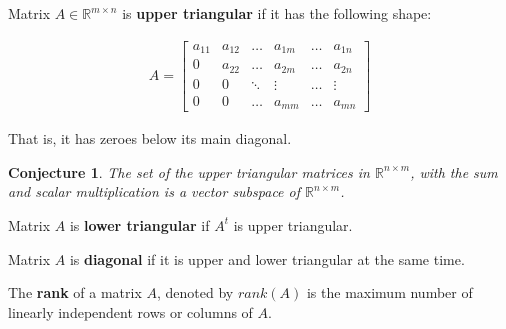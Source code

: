 \documentclass[aspectratio=169]{beamer}
\newtheorem{proposition}{Conjecture}[section]
\begin{document}
\begin{frame}
    \begin{definition}
        Matrix $A\in\mathbb{R}^{m\times n}$ is \textbf{upper triangular} if it has the following shape:
        
        \begin{align*}
            A=\left[
            \begin{array}{cccccc}
                a_{11} & a_{12} & \ldots & a_{1m} & \ldots & a_{1n}\\
                0 & a_{22} & \ldots & a_{2m} & \ldots & a_{2n}\\
                0 & 0 & \ddots & \vdots & \ldots& \vdots\\
                0 & 0 & \ldots & a_{mm} & \ldots & a_{mn}
            \end{array}
            \right]
        \end{align*}
        
        That is, it has zeroes below its main diagonal.
    \end{definition}
    
    \begin{proposition}
        The set of the upper triangular matrices in $\mathbb{R}^{n\times m}$, with the sum and scalar multiplication is a vector subspace of $\mathbb{R}^{n\times m}$.
    \end{proposition}
\end{frame}

\begin{frame}
    \begin{definition}
        Matrix $A$ is \textbf{lower triangular} if $A^t$ is upper triangular.
    \end{definition}

    \begin{definition}
        Matrix $A$ is \textbf{diagonal} if it is upper and lower triangular at the same time.
    \end{definition}

    \begin{definition}
        The \textbf{rank} of a matrix $A$, denoted by $rank(A)$ is the maximum number of linearly independent rows or columns of $A$.
    \end{definition}
\end{frame}
\end{document}
